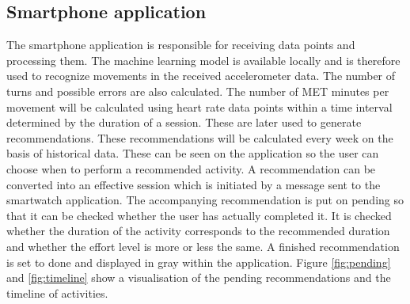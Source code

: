 \documentclass[twocolumn]{phdsymp} %
\begin{document}
\subsection{Smartphone application}
The smartphone application is responsible for receiving data points and processing them. The machine learning model is available locally and is therefore used to recognize movements in the received accelerometer data. The number of turns and possible errors are also calculated. The number of MET minutes per movement will be calculated using heart rate data points within a time interval determined by the duration of a session. These are later used to generate recommendations.
These recommendations will be calculated every week on the basis of historical data. These can be seen on the application so the user can choose when to perform a recommended activity. A recommendation can be converted into an effective session which is initiated by a message sent to the smartwatch application. The accompanying recommendation is put on pending so that it can be checked whether the user has actually completed it. It is checked whether the duration of the activity corresponds to the recommended duration and whether the effort level is more or less the same.
A finished recommendation is set to done and displayed in gray within the application. Figure \ref{fig:pending} and \ref{fig:timeline} show a visualisation of the pending recommendations and the timeline of activities.

\begin{figure}[!htpd]
\centering
\begin{floatrow}
\end{floatrow}
\end{figure}
\end{document}
